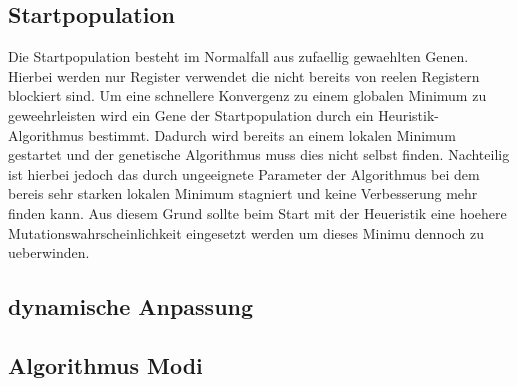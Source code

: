 \subsection{Startpopulation}
Die Startpopulation besteht im Normalfall aus zufaellig gewaehlten Genen. Hierbei werden nur Register verwendet die nicht bereits von reelen Registern blockiert sind.
Um eine schnellere Konvergenz zu einem globalen Minimum zu geweehrleisten wird ein Gene der Startpopulation durch ein Heuristik-Algorithmus bestimmt. Dadurch wird bereits an einem lokalen Minimum gestartet und der genetische Algorithmus muss dies nicht selbst finden. 
Nachteilig ist hierbei jedoch das durch ungeeignete Parameter der Algorithmus bei dem bereis sehr starken lokalen Minimum stagniert und keine Verbesserung mehr finden kann. Aus diesem Grund sollte beim Start mit der Heueristik eine hoehere Mutationswahrscheinlichkeit eingesetzt werden um dieses Minimu dennoch zu ueberwinden.

\subsection{dynamische Anpassung}

\subsection{Algorithmus Modi}
